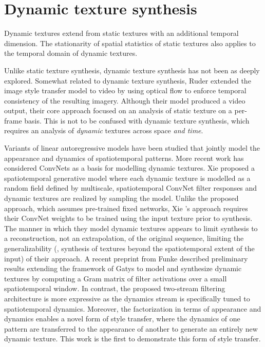 \section{Dynamic texture synthesis}

Dynamic textures extend from static textures with an additional temporal dimension. The stationarity of spatial statistics of static textures also applies to the temporal domain of dynamic textures.

Unlike static texture synthesis, dynamic texture synthesis has not been as deeply explored. Somewhat related to dynamic texture synthesis, Ruder \etal \cite{ruder2016} extended the image style transfer model to video by using
optical flow to enforce temporal consistency of the
resulting imagery. Although their model produced a video output, their core approach focused on an analysis of static texture on a per-frame basis. This is not to be confused with dynamic texture synthesis, which requires an analysis of \emph{dynamic} textures across space \emph{and time}.

Variants of linear autoregressive models have been studied
\cite{szummer1996,doretto2003,wang2003,fitzgibbon2001} that jointly model the appearance and
dynamics of spatiotemporal patterns.
More recent work has considered ConvNets as a basis for modelling 
dynamic textures.
Xie \etal \cite{xie2017synthesizing} proposed a spatiotemporal
generative model where each dynamic texture is modelled as a random
field defined by multiscale, spatiotemporal ConvNet filter responses
and dynamic textures are realized by sampling the model.
Unlike the proposed approach, which assumes pre-trained fixed networks,
Xie \etal's \cite{xie2017synthesizing} approach requires their ConvNet weights to be trained using the input texture prior to synthesis. The manner in which they model dynamic textures appears to limit synthesis to a reconstruction, not an extrapolation, of the original sequence, limiting the generalizability (\eg, synthesis of textures beyond the spatiotemporal extent of the input) of their approach.
A recent preprint from Funke \etal \cite{funke2017} described preliminary 
results extending the framework of Gatys \etal \cite{gatys2015} 
to model and  synthesize dynamic textures by computing a Gram 
matrix of filter activations over a small spatiotemporal window.
In contrast, the proposed two-stream filtering architecture is more 
expressive as the dynamics stream is specifically tuned to 
spatiotemporal dynamics.
Moreover, the factorization
in terms of appearance and dynamics enables a novel form of
style transfer, where the dynamics of one pattern are 
transferred to the appearance of another to generate an
entirely new dynamic texture.
This work is the first to demonstrate this form of style transfer.


